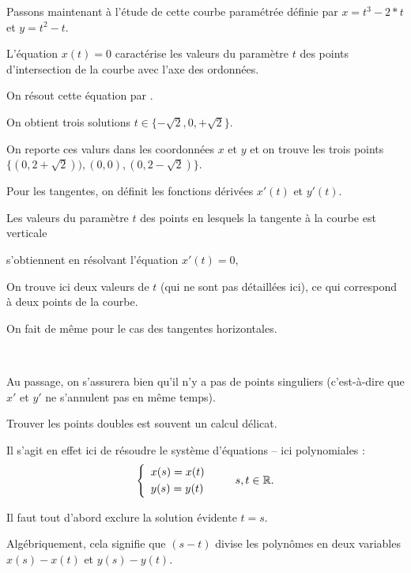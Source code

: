 \diapo

Passons maintenant à l'étude de cette courbe paramétrée définie par $x = t^3-2*t$ et $y = t^2-t$.


\change
L'équation $x(t)=0$ caractérise les valeurs du paramètre $t$ des points d'intersection de la courbe
avec l'axe des ordonnées.

\change
On résout cette équation par 
.

\change
On obtient trois solutions $t \in \{-\sqrt2,0,+\sqrt2\}$.

\change
On reporte ces valurs dans les coordonnées $x$ et $y$ et on trouve les trois points
$\{(0,2+\sqrt2)),(0,0),(0,2-\sqrt2)\}$.

\change
Pour les tangentes, on définit les fonctions dérivées $x'(t)$ et $y'(t)$.

\change
Les valeurs du paramètre $t$ des points en lesquels la tangente à la courbe est verticale 

\change
s'obtiennent en résolvant l'équation $x'(t)=0$, 


On trouve ici deux valeurs de $t$ (qui ne sont pas détaillées ici), ce qui correspond à deux points de la courbe.

\change

On fait de même pour le cas des tangentes horizontales.

~

Au passage, on s'assurera bien qu'il n'y a pas de points singuliers (c'est-à-dire que $x'$ et $y'$ ne s'annulent pas en même temps).
  
  
\diapo

Trouver les points doubles est souvent un calcul délicat.


Il s'agit en effet ici de résoudre le système d'équations -- ici polynomiales :
   $$\left\{
  \begin{array}{l}
  x(s) =  x(t)\\[1mm]
  y(s) =  y(t)
  \end{array}
  \right.\qquad  s,t \in \mathbb{R}.$$ 
  
  
\change

Il faut tout d'abord exclure la solution évidente $t=s$. 

\change

Algébriquement, cela signifie
  que $(s-t)$ divise les polynômes en deux variables $x(s)-x(t)$ et
  $y(s)-y(t)$. 

